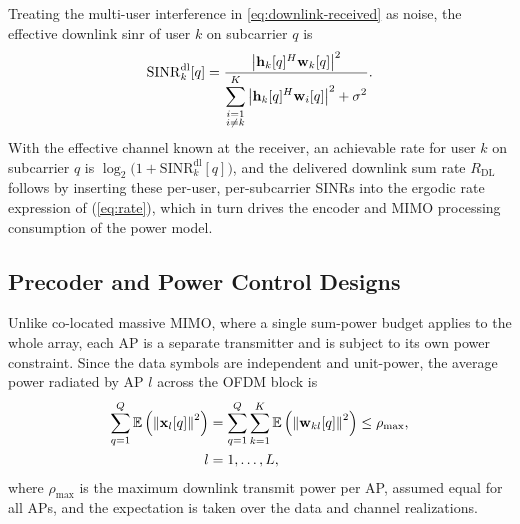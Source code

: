 Treating the multi-user interference in \eqref{eq:downlink-received} as noise,
the effective downlink \gls{sinr} of user $k$ on subcarrier $q$ is
\begin{equation}
\label{eq:downlink-sinr}
\mathrm{SINR}_{k}^{\mathrm{dl}}[q] =
\frac{\left\lvert\boldsymbol{\mathrm{h}}_{k}[q]^{H}\boldsymbol{\mathrm{w}}_{k}[q]\right\rvert^{2}}
{\displaystyle\sum_{\substack{i=1 \\ i\neq k}}^{K}
\left\lvert\boldsymbol{\mathrm{h}}_{k}[q]^{H}\boldsymbol{\mathrm{w}}_{i}[q]\right\rvert^{2} + \sigma^{2}} .
\end{equation}
With the effective channel known at the receiver, an achievable rate for user
$k$ on subcarrier $q$ is $\log_{2}\!\big(1+\mathrm{SINR}_{k}^{\mathrm{dl}}[q]\big)$,
and the delivered downlink sum rate $R_{\mathrm{DL}}$ follows by inserting these
per-user, per-subcarrier SINRs into the ergodic rate expression of
 (\eqref{eq:rate}), which in turn drives the encoder and MIMO
processing consumption of the power model.


\subsection{Precoder and Power Control Designs}
\label{ssec:designs}

Unlike co-located massive MIMO, where a single sum-power budget applies to the
whole array, each AP is a separate transmitter and is subject to its own power
constraint. Since the data symbols are independent and unit-power, the average
power radiated by AP $l$ across the OFDM block is
\begin{align}
\label{eq:power-constraint}
\sum_{q=1}^{Q}\mathbb{E}\left(\left\lVert\boldsymbol{\mathrm{x}}_{l}[q]\right\rVert^{2}\right)
&= \sum_{q=1}^{Q}\sum_{k=1}^{K}\mathbb{E}\left(\left\lVert\boldsymbol{\mathrm{w}}_{kl}[q]\right\rVert^{2}\right)
\leq \rho_{\max}, \\
  l&=1,\dots,L,
\end{align}
where $\rho_{\max}$ is the maximum downlink transmit power per AP, assumed equal
for all APs, and the expectation is taken over the data and channel
realizations.

